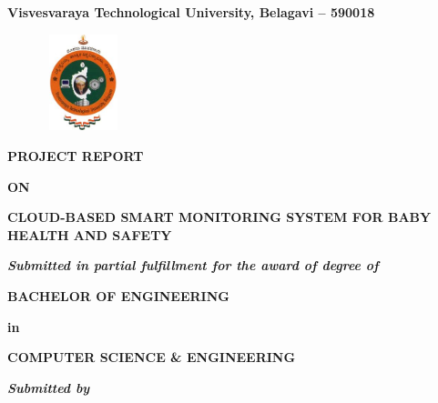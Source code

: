 \documentclass[12pt,a4paper]{report}
\begin{document}
\pagestyle{empty}
\begin{center}

{\large \textbf{Visvesvaraya Technological University, Belagavi – 590018}}
\begin{figure}[hbtp]
\centering
\includegraphics[width=2.3cm,height=2.8cm]{./pic/vtu}
\end{figure}

\textbf{PROJECT REPORT}
\par
\textbf{ON}
\par
\vspace{6pt}
{\Large \textbf{CLOUD-BASED SMART MONITORING SYSTEM
FOR BABY HEALTH AND SAFETY}}
\par
\vspace{12pt}
\par
\textit{\textbf{Submitted in partial fulfillment for the award of degree of }}
\par
\vspace{12pt}
\large \textbf{BACHELOR OF ENGINEERING }
\par
\textbf{in}
\par
\large \textbf{COMPUTER SCIENCE \& ENGINEERING}
\par
\vspace{12pt}
\textit{\textbf{Submitted by}}
\vspace{8pt}


\end{center}
\end{document}
